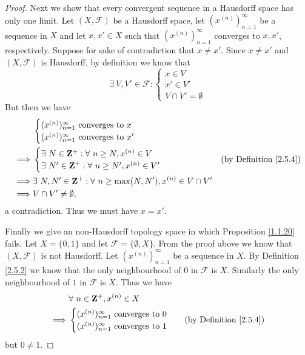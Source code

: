 \begin{proof}
    Next we show that every convergent sequence in a Hausdorff space has only one limit.
    Let \((X, \mathcal{F})\) be a Hausdorff space, let \((x^{(n)})_{n = 1}^\infty\) be a sequence in \(X\) and let \(x, x' \in X\) such that \((x^{(n)})_{n = 1}^\infty\) converges to \(x, x'\), respectively.
    Suppose for sake of contradiction that \(x \neq x'\).
    Since \(x \neq x'\) and \((X, \mathcal{F})\) is Hausdorff, by definition we know that
    \[
        \exists\ V, V' \in \mathcal{F} : \begin{cases}
            x \in V   \\
            x' \in V' \\
            V \cap V' = \emptyset
        \end{cases}
    \]
    But then we have
    \begin{align*}
                 & \begin{cases}
            (x^{(n)})_{n = 1}^\infty \text{ converges to } x \\
            (x^{(n)})_{n = 1}^\infty \text{ converges to } x'
        \end{cases}                                                                                                \\
        \implies & \begin{cases}
            \exists\ N \in \mathbf{Z}^+ : \forall\ n \geq N, x^{(n)} \in V \\
            \exists\ N' \in \mathbf{Z}^+ : \forall\ n \geq N', x^{(n)} \in V'
        \end{cases}                                                           & \text{(by Definition \ref{2.5.4})} \\
        \implies & \exists\ N, N' \in \mathbf{Z}^+ : \forall\ n \geq \max(N, N'), x^{(n)} \in V \cap V'                                      \\
        \implies & V \cap V' \neq \emptyset,
    \end{align*}
    a contradiction.
    Thus we must have \(x = x'\).

    Finally we give an non-Hausdorff topology space in which Proposition \ref{1.1.20} fails.
    Let \(X = \{0, 1\}\) and let \(\mathcal{F} = \{\emptyset, X\}\).
    From the proof above we know that \((X, \mathcal{F})\) is not Hausdorff.
    Let \((x^{(n)})_{n = 1}^\infty\) be a sequence in \(X\).
    By Definition \ref{2.5.2} we know that the only neighbourhood of \(0\) in \(\mathcal{F}\) is \(X\).
    Similarly the only neighbourhood of \(1\) in \(\mathcal{F}\) is \(X\).
    Thus we have
    \begin{align*}
                 & \forall\ n \in \mathbf{Z}^+, x^{(n)} \in X                                      \\
        \implies & \begin{cases}
            (x^{(n)})_{n = 1}^\infty \text{ converges to } 0 \\
            (x^{(n)})_{n = 1}^\infty \text{ converges to } 1
        \end{cases}                 & \text{(by Definition \ref{2.5.4})}
    \end{align*}
    but \(0 \neq 1\).
\end{proof}

